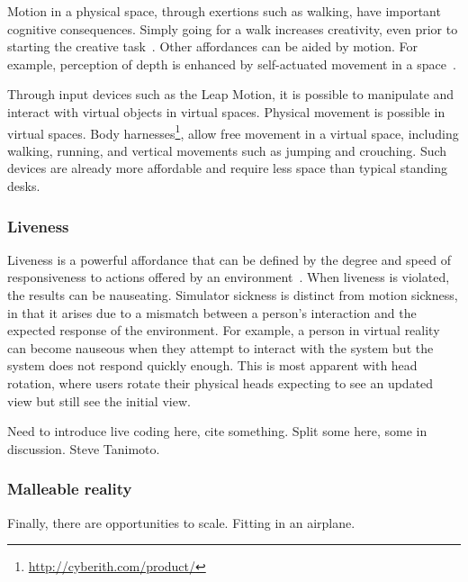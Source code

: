 \documentclass[conference]{IEEEtran}
\begin{document}
Motion in a physical space, through exertions such as walking, have important cognitive consequences.
Simply going for a walk increases creativity, even prior to starting the creative task~\cite{Oppezzo:2014}.
Other affordances can be aided by motion. For example, perception of depth is enhanced by self-actuated movement in a space~\cite{HeldAndHein}.

Through input devices such as the Leap Motion, it is possible to manipulate and interact with virtual objects in virtual spaces.
Physical movement is possible in virtual spaces.  Body harnesses\footnote{\url{http://cyberith.com/product/}}, allow free movement in a virtual space, including walking, running, and vertical movements such as jumping and crouching.  Such devices are already more affordable and require less space than typical standing desks.



\subsubsection{Liveness}

Liveness is a powerful affordance that can be defined by the degree and speed of responsiveness to actions offered by an environment~\cite{Tanimoto:Liveness}.
When liveness is violated, the results can be nauseating.
Simulator sickness is distinct from motion sickness, in that it arises due to a mismatch between a person's interaction and the expected response of the environment.
For example, a person in virtual reality can become nauseous when they attempt to interact with the system but the system does not respond quickly enough.
This is most apparent with head rotation, where users rotate their physical heads expecting to see an updated view but still see the initial view.

Need to introduce live coding here, cite something.  Split some here, some in discussion.
Steve Tanimoto.

\subsubsection{Malleable reality}

Finally, there are opportunities to scale.
Fitting in an airplane.
\end{document}
